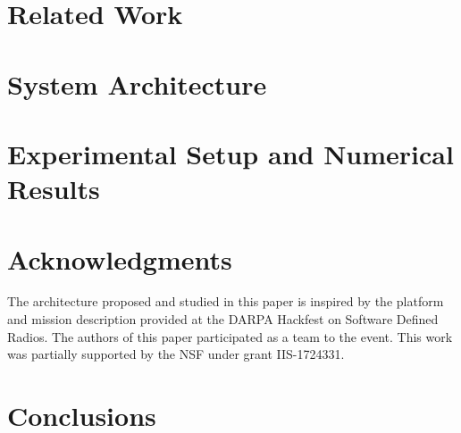 \documentclass[conference]{IEEEtran}
\begin{document}
\section{Related Work}
\label{relatedwork}



\section{System Architecture}
\label{sysmodel}




\section{Experimental Setup and Numerical Results}
\label{numresult}



\vspace{-2mm}
\section{Acknowledgments}
\label{sec:ACK}

The architecture proposed and studied in this paper is inspired by the platform and mission description provided at the DARPA Hackfest on Software Defined Radios. The authors of this paper participated as a team to the event. This work was partially supported by the NSF under grant IIS-1724331.
\vspace{-1mm}
\section{Conclusions}
\label {conclusion}


\vspace{-1mm}


\end{document}
